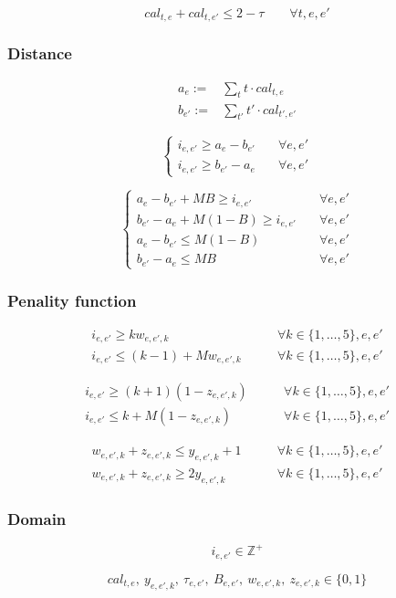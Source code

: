 \documentclass[11pt, a4paper, leqno]{article}
\begin{document}
	\[
		cal_{t,e}+cal_{t,e'} \leq 2 - \tau \qquad \forall t,e,e'
	\]
	
	\subsubsection{Distance}
	
	\begin{align*}
		a_e :=& \sum_{t} t\cdot cal_{t,e} \\
		b_{e'} :=& \sum_{t'} t'\cdot cal_{t',e'}
	\end{align*}
	
	\[
	\begin{cases}
		i_{e,e'} \geq a_e-b_{e'}&\quad \forall e,e'\\
		i_{e,e'} \geq b_{e'}-a_e&\quad \forall e,e'
	\end{cases}
	\]
	
	\[
	\begin{cases}
	a_e-b_{e'} + MB \geq i_{e,e'}&\quad \forall e,e'\\
	b_{e'}-a_e + M(1-B) \geq i_{e,e'}&\quad \forall e,e'\\
	a_e-b_{e'} \leq M(1-B)&\quad \forall e,e'\\
	b_{e'}-a_e \leq MB&\quad \forall e,e'
	\end{cases}
	\]
	
	\subsubsection{Penality function}
	
	\begin{align*}
		i_{e,e'} \geq k w_{e,e',k} &\qquad\forall k \in \{1,\dots,5\},e,e'\\
		i_{e,e'} \leq (k-1) + M  w_{e,e',k} &\qquad\forall k \in \{1,\dots,5\},e,e'
	\end{align*}
	
	\begin{align*}
		i_{e,e'} \geq \left(k+1\right)\left(1-z_{e,e',k}\right) &\qquad\forall k \in \{1,\dots,5\},e,e'\\
		i_{e,e'} \leq k + M  (1-z_{e,e',k}) &\qquad\forall k \in \{1,\dots,5\},e,e'
	\end{align*}
	
	\begin{align*}
		w_{e,e',k} + z_{e,e',k} \leq y_{e,e',k} + 1 &\qquad\forall k \in \{1,\dots,5\},e,e'\\
		w_{e,e',k} + z_{e,e',k} \geq 2y_{e,e',k} &\qquad\forall k \in \{1,\dots,5\},e,e'
	\end{align*}
	
	\subsubsection{Domain}
	
	\[
		i_{e,e'} \in \mathbb{Z}^{+}
	\]
	
	\[
		cal_{t,e},\ y_{e,e',k},\ \tau_{e,e'},\ B_{e,e'},\ w_{e,e',k},\ z_{e,e',k} \in \{0,1\}
	\]
\end{document}
